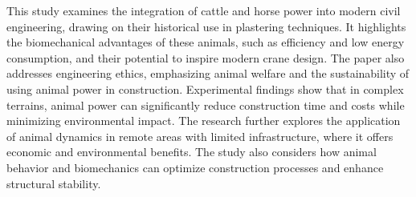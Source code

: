 This study examines the integration of cattle and horse power into modern civil engineering, drawing on their historical use in plastering techniques. It highlights the biomechanical advantages of these animals, such as efficiency and low energy consumption, and their potential to inspire modern crane design. The paper also addresses engineering ethics, emphasizing animal welfare and the sustainability of using animal power in construction. Experimental findings show that in complex terrains, animal power can significantly reduce construction time and costs while minimizing environmental impact. The research further explores the application of animal dynamics in remote areas with limited infrastructure, where it offers economic and environmental benefits. The study also considers how animal behavior and biomechanics can optimize construction processes and enhance structural stability.
